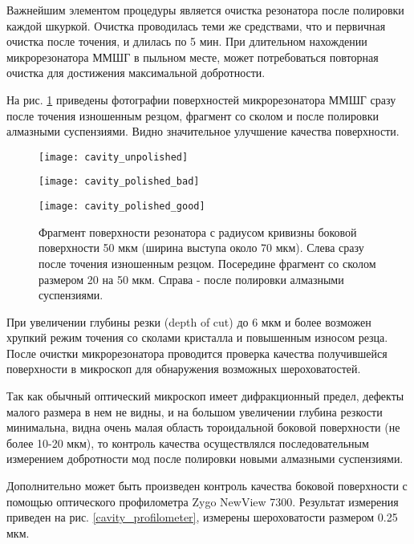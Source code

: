 Важнейшим элементом процедуры является очистка резонатора после полировки каждой шкуркой. Очистка проводилась теми же средствами, что и первичная очистка после точения, и длилась по 5 мин. При длительном нахождении микрорезонатора ММШГ в пыльном месте, может потребоваться повторная очистка для достижения максимальной добротности.

На рис. \ref{cavity_polished} приведены фотографии поверхностей микрорезонатора ММШГ сразу после точения изношенным резцом, фрагмент со сколом и после полировки алмазными суспензиями. Видно значительное улучшение качества поверхности.

\begin{figure}[ht]
  \begin{minipage}[ht]{0.32\linewidth}\centering
    \texttt{[image: cavity\_unpolished]}
  \end{minipage}
  \hfill
  \begin{minipage}[ht]{0.32\linewidth}\centering
    \texttt{[image: cavity\_polished\_bad]}
  \end{minipage}
  \hfill
  \begin{minipage}[ht]{0.32\linewidth}\centering
    \texttt{[image: cavity\_polished\_good]}
  \end{minipage}
  \caption{Фрагмент поверхности резонатора с радиусом кривизны боковой поверхности 50 мкм (ширина выступа около 70 мкм). Слева сразу после точения изношенным резцом. Посередине фрагмент со сколом размером 20 на 50 мкм. Справа - после полировки алмазными суспензиями.}
  \label{cavity_polished}
\end{figure}

При увеличении глубины резки (depth of cut) до 6 мкм и более возможен хрупкий режим точения со сколами кристалла и повышенным износом резца. После очистки микрорезонатора проводится проверка качества получившейся поверхности в микроскоп для обнаружения возможных шероховатостей.

Так как обычный оптический микроскоп имеет дифракционный предел, дефекты малого размера в нем не видны, и на большом увеличении глубина резкости минимальна, видна очень малая область тороидальной боковой поверхности (не более 10-20 мкм), то контроль качества осуществлялся последовательным измерением добротности мод после полировки новыми алмазными суспензиями.

Дополнительно может быть произведен контроль качества боковой поверхности с помощью оптического профилометра Zygo NewView 7300. Результат измерения приведен на рис. \ref{cavity_profilometer}, измерены шероховатости размером 0.25 мкм.

